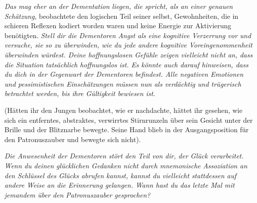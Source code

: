 \emph{Das mag eher an der Dementation liegen, die spricht, als an einer genauen Schätzung,} beobachtete den logischen Teil seiner selbst, Gewohnheiten, die in schieren Reflexen kodiert worden waren und keine Energie zur Aktivierung benötigten. \emph{Stell dir die Dementoren Angst als eine kognitive Verzerrung vor und versuche, sie so zu überwinden, wie du jede andere kognitive Voreingenommenheit überwinden würdest. Deine hoffnungslosen Gefühle zeigen vielleicht nicht an, dass die Situation tatsächlich hoffnungslos ist. Es könnte auch darauf hinweisen, dass du dich in der Gegenwart der Dementoren befindest. Alle negativen Emotionen und pessimistischen Einschätzungen müssen nun als verdächtig und trügerisch betrachtet werden, bis ihre Gültigkeit bewiesen ist.}

(Hätten ihr den Jungen beobachtet, wie er nachdachte, hättet ihr gesehen, wie sich ein entferntes, abstraktes, verwirrtes Stirnrunzeln über sein Gesicht unter der Brille und der Blitznarbe bewegte. Seine Hand blieb in der Ausgangsposition für den Patronuszauber und bewegte sich nicht).

\emph{Die Anwesenheit der Dementoren stört den Teil von dir, der Glück verarbeitet. Wenn du deinen glücklichen Gedanken nicht durch mnemonische Assoziation an den Schlüssel des Glücks abrufen kannst, kannst du vielleicht stattdessen auf andere Weise an die Erinnerung gelangen. Wann hast du das letzte Mal mit jemandem über den Patronuszauber gesprochen?}

